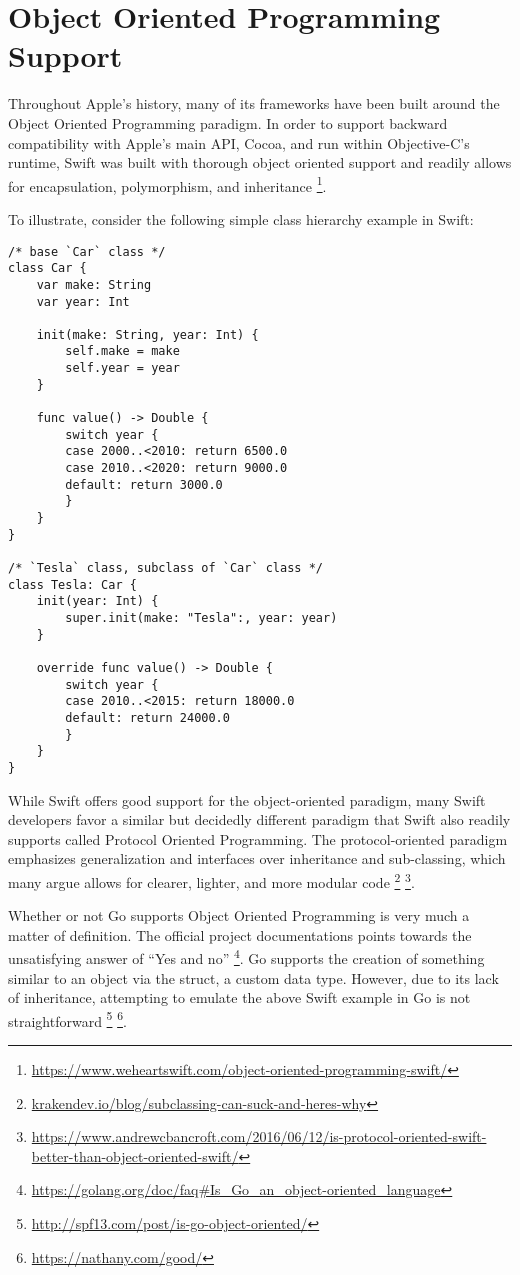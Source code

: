 \documentclass[letterpaper]{article}
\begin{document}
\section{Object Oriented Programming Support}

Throughout Apple’s history, many of its frameworks have been built around the Object Oriented Programming paradigm. In order to support backward compatibility with Apple’s main API, Cocoa, and run within Objective-C’s runtime, Swift was built with thorough object oriented support and readily allows for encapsulation, polymorphism, and inheritance \footnote{\url{https://www.weheartswift.com/object-oriented-programming-swift/}}.

To illustrate, consider the following simple class hierarchy example in Swift:

\begin{verbatim}
/* base `Car` class */
class Car {
    var make: String
    var year: Int

    init(make: String, year: Int) {
        self.make = make
        self.year = year
    }

    func value() -> Double {
        switch year {
        case 2000..<2010: return 6500.0
        case 2010..<2020: return 9000.0
        default: return 3000.0
        }
    }
}

/* `Tesla` class, subclass of `Car` class */
class Tesla: Car {
    init(year: Int) {
        super.init(make: "Tesla":, year: year)
    }

    override func value() -> Double {
        switch year {
        case 2010..<2015: return 18000.0
        default: return 24000.0
        }
    }
}
\end{verbatim}

While Swift offers good support for the object-oriented paradigm, many Swift developers favor a similar but decidedly different paradigm that Swift also readily supports called Protocol Oriented Programming. The protocol-oriented paradigm emphasizes generalization and interfaces over inheritance and sub-classing, which many argue allows for clearer, lighter, and more modular code \footnote{\url{krakendev.io/blog/subclassing-can-suck-and-heres-why}} \footnote{\url{https://www.andrewcbancroft.com/2016/06/12/is-protocol-oriented-swift-
better-than-object-oriented-swift/}}.

Whether or not Go supports Object Oriented Programming is very much a matter of definition. The official project documentations points towards the unsatisfying answer of “Yes and no” \footnote{\url{https://golang.org/doc/faq#Is_Go_an_object-oriented_language}}. Go supports the creation of something similar to an object via the struct, a custom data type. However, due to its lack of inheritance, attempting to emulate the above Swift example in Go is not straightforward \footnote{\url{http://spf13.com/post/is-go-object-oriented/}} \footnote{\url{https://nathany.com/good/}}.
\end{document}
